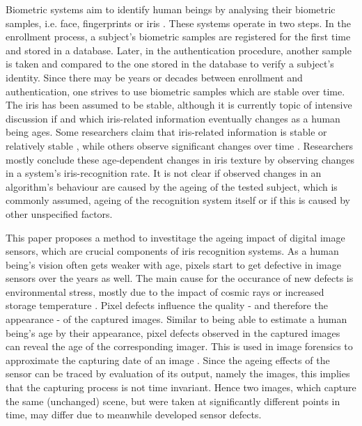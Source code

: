 \documentclass[10pt,twocolumn,letterpaper]{article}
\begin{document}
Biometric systems aim to identify human beings by analysing their biometric samples, i.e. face, fingerprints or iris \cite{rathgeb}. These systems operate in two steps. In the enrollment process, a subject's biometric samples are registered for the first time and stored in a database. Later, in the authentication procedure, another sample is taken and compared to the one stored in the database to verify a subject's identity. Since there may be years or decades between enrollment and authentication, one strives to use biometric samples which are stable over time. The iris has been assumed to be stable, although it is currently topic of intensive discussion if and which iris-related information eventually changes as a human being ages. Some researchers claim that iris-related information is stable or relatively stable \cite{daugmanNoChange,BGrother13a}, while others observe significant changes over time \cite{rankinChange, rankinChangeResponse, fenkerIrisAging, czajkaTemplateAging, fairhurstNonstability}. Researchers mostly conclude these age-dependent changes in iris texture by observing changes in a system's iris-recognition rate. It is not clear if observed changes in an algorithm's behaviour are caused by the ageing of the tested subject, which is commonly assumed, ageing of the recognition system itself or if this is caused by other unspecified factors.

This paper proposes a method to investitage the ageing impact of digital image sensors, which are crucial components of iris recognition systems. As a human being's vision often gets weaker with age, pixels start to get defective in image sensors over the years as well. The main cause for the occurance of new defects is environmental stress, mostly due to the impact of cosmic rays or increased storage temperature \cite{nampoothiri, theuwissen, fridrich}. Pixel defects influence the quality - and therefore the appearance - of the captured images. Similar to being able to estimate a human being's age by their appearance, pixel defects observed in the captured images can reveal the age of the corresponding imager. This is used in image forensics to approximate the capturing date of an image \cite{fridrich}. Since the ageing effects of the sensor can be traced by evaluation of its output, namely the images, this implies that the capturing process is not time invariant. Hence two images, which capture the same (unchanged) scene, but were taken at significantly different points in time, may differ due to meanwhile developed sensor defects.
\end{document}
